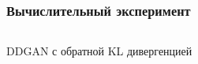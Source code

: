 \documentclass[8pt]{beamer}
\begin{document}
\begin{frame}
	\frametitle{Вычислительный эксперимент}
	\begin{columns}
		\begin{column}{0.8\textwidth}
			\begin{block}{DDGAN с обратной KL дивергенцией}
				\begin{figure}[H]
				\end{figure}
			\end{block}
		\end{column}
		\begin{column}{0.23\textwidth}
			\begin{figure}[H]
				

\end{figure}
\end{column}
\end{columns}
\end{frame}
\end{document}

